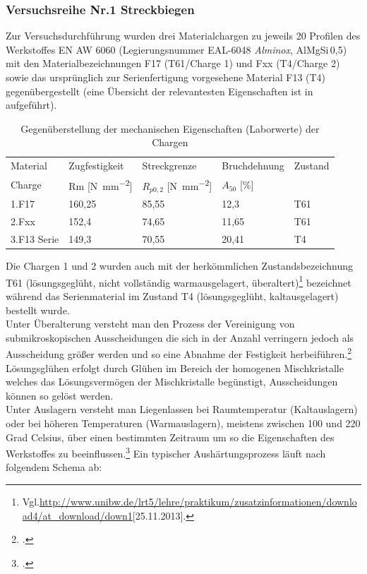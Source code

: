 \documentclass[12pt,a4paper,parskip]{scrartcl}
\begin{document}
\subsubsection{Versuchsreihe Nr.1 Streckbiegen}
\label{sec:versuchsreihe1}
Zur Versuchsdurchführung wurden drei Materialchargen zu jeweils 20 Profilen des Werkstoffes EN AW 6060 (Legierungsnummer EAL-6048 \emph{Alminox}, AlMgSi\,0,5) mit den Materialbezeichnungen F17 (T61/Charge 1) und Fxx (T4/Charge 2) sowie das ursprünglich zur Serienfertigung vorgesehene Material F13 (T4)  gegenübergestellt (eine Übersicht der relevantesten Eigenschaften ist in  aufgeführt).
\begin{table}[hbtp]
\caption{Gegenüberstellung der mechanischen Eigenschaften (Laborwerte) der Chargen}
\label{tab:chargeneigenschaften}
\centering
\begin{tabular}{lllll}
\toprule
Material & Zugfestigkeit & Streckgrenze & Bruchdehnung & Zustand \\
Charge &  Rm [\si{\newton\per\milli\meter\squared}] &  $R_{p0,2}$ [\si{\newton\per\milli\meter\squared}] &  $A_{50}$ [\%] & \\
\midrule
1.F17 & 160,25 & 85,55 &  12,3  & T61 \\
2.Fxx & 152,4 & 74,65 &   11,65  & T61 \\
3.F13 Serie & 149,3 & 70,55 & 20,41  & T4 \\
\bottomrule




\end{tabular}
\end{table}



 Die Chargen 1 und 2 wurden auch mit der herkömmlichen Zustandsbezeichnung T61 (lösungsgeglüht, nicht vollständig warmausgelagert, überaltert)\footnote{Vgl.\url{http://www.unibw.de/lrt5/lehre/praktikum/zusatzinformationen/download4/at_download/down1}[25.11.2013].} bezeichnet während das Serienmaterial im Zustand T4 (lösungsgeglüht, kaltausgelagert) bestellt wurde. \\
 Unter Überalterung versteht man  den Prozess der Vereinigung von  submikroskopischen Ausscheidungen die sich  in der Anzahl verringern jedoch als Ausscheidung größer werden und so eine Abnahme der Festigkeit herbeiführen.\footcite[Vgl.][52]{wki}\\
  Lösungsglühen erfolgt durch Glühen im Bereich der homogenen Mischkristalle welches das   Lösungsvermögen der Mischkristalle begünstigt, Ausscheidungen können so gelöst werden.\\
   Unter Auslagern versteht man Liegenlassen bei Raumtemperatur (Kaltauslagern) oder bei  höheren Temperaturen (Warmauslagern), meistens zwischen 100 und 220 Grad Celsius, über einen bestimmten Zeitraum um so die Eigenschaften des Werkstoffes zu beeinflussen.\footcite[Vgl.][213]{wk}
Ein typischer Aushärtungsprozess läuft nach folgendem Schema ab:
\end{document}

